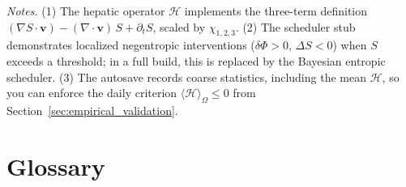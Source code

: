 \documentclass[12pt]{article}
\begin{document}
\noindent\emph{Notes.}
(1) The hepatic operator \(\mathcal{H}\) implements the three-term definition
\((\nabla S\!\cdot\!\mathbf{v}) - (\nabla\!\cdot\!\mathbf{v})\,S + \partial_t S\),
scaled by \(\chi_{1,2,3}\).
(2) The scheduler stub demonstrates localized negentropic interventions
(\(\delta\Phi>0,\,\Delta S<0\)) when \(S\) exceeds a threshold; in a full build,
this is replaced by the Bayesian entropic scheduler.
(3) The autosave records coarse statistics, including the mean \(\mathcal{H}\),
so you can enforce the daily criterion \(\langle\mathcal{H}\rangle_\Omega \le 0\)
from Section~\ref{sec:empirical_validation}.

\section{Glossary}
\label{app:glossary}
\end{document}
